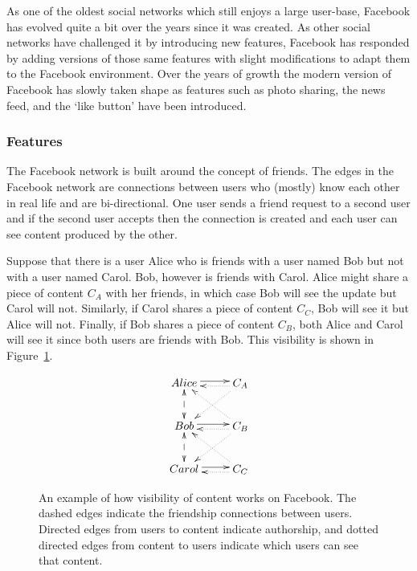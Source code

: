 As one of the oldest social networks which still enjoys a large user-base, Facebook has evolved quite a bit over the years since it was created. As other social networks have challenged it by introducing new features, Facebook has responded by adding versions of those same features with slight modifications to adapt them to the Facebook environment. Over the years of growth the modern version of Facebook has  slowly taken shape as features such as photo sharing, the news feed, and the `like button' have been introduced.

\subsubsection{Features}

The Facebook network is built around the concept of friends. The edges in the Facebook network are connections between users who (mostly) know each other in real life and are bi-directional. One user sends a friend request to a second user and if the second user accepts then the connection is created and each user can see content produced by the other.

Suppose that there is a user Alice who is friends with a user named Bob but not with a user named Carol. Bob, however is friends with Carol. Alice might share a piece of content $C_{A}$ with her friends, in which case Bob will see the update but Carol will not. Similarly, if Carol shares a piece of content $C_{C}$, Bob will see it but Alice will not. Finally, if Bob shares a piece of content $C_{B}$, both Alice and Carol will see it since both users are friends with Bob. This visibility is shown in Figure~\ref{fig:fb_content_visibility}.

\begin{figure}
  \centering
\begin{displaymath}
  \xymatrix{
    Alice \ar@<0.5ex>[r] & C_{A} \ar@{.>}@<0.5ex>[l] \ar@{.>}[dl] \\
    Bob \ar@{<-->}[u] \ar@{<-->}[d] \ar@<0.5ex>[r] & C_{B} \ar@{.>}@<0.5ex>[l] \ar@{.>}[ul] \ar@{.>}[dl]\\
    Carol \ar@<0.5ex>[r] & C_{C} \ar@{.>}@<0.5ex>[l] \ar@{.>}[lu] }
\end{displaymath} 
  \caption[Visibility of content on Facebook]{An example of how visibility of content works on Facebook. The dashed edges indicate the friendship connections between users. Directed edges from users to content indicate authorship, and dotted directed edges from content to users indicate which users can see that content.}
\label{fig:fb_content_visibility}
\end{figure}

